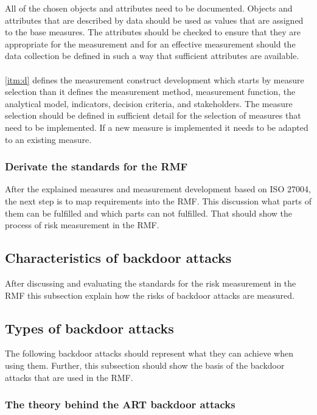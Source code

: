 All of the chosen objects and attributes need to be documented. Objects and attributes that are described by data should be used as values that are assigned to the base measures. The attributes should be checked to ensure that they are appropriate for the measurement and for an effective measurement should the data collection be defined in such a way that sufficient attributes are available. \\ \\
\ref{itm:d} defines the measurement construct development which starts by measure selection than it defines the measurement method, measurement function, the analytical model, indicators, decision criteria, and stakeholders. The measure selection should be defined in sufficient detail for the selection of measures that need to be implemented. If a new measure is implemented it needs to be adapted to an existing measure.

\subsubsection*{Derivate the standards for the RMF}

After the explained measures and measurement development based on ISO 27004, the next step is to map requirements into the RMF. This discussion what parts of them can be fulfilled and which parts can not fulfilled. That should show the process of risk measurement in the RMF.

\subsection{Characteristics of backdoor attacks}

After discussing and evaluating the standards for the risk measurement in the RMF this subsection explain how the risks of backdoor attacks are measured.

\subsection{Types of backdoor attacks}

The following backdoor attacks should represent what they can achieve when using them. Further, this subsection should show the basis of the backdoor attacks that are used in the RMF.

\subsubsection*{The theory behind the ART backdoor attacks}

